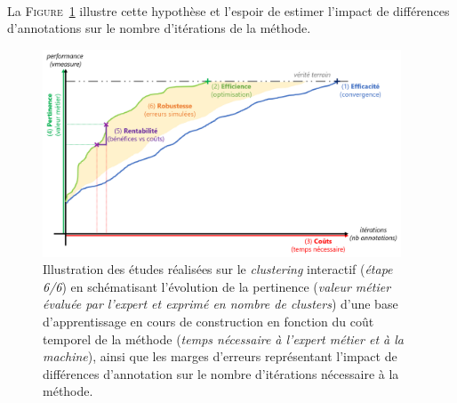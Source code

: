 	\begin{tcolorbox}[
		title=\faVial~\textbf{Hypothèse de robustesse}~\faVial,
		colback=colorTcolorboxHypothesis!15,
		colframe=colorTcolorboxHypothesis!75,
		width=\linewidth
	]
		 \\
		
		La \textsc{Figure~\ref{figure:4.6-HYPOTHESE-ROBUSTESSE}} illustre cette hypothèse et l'espoir de estimer l'impact de différences d'annotations sur le nombre d'itérations de la méthode.
		\begin{figure}[H]  %
			\centering
			\includegraphics[width=0.95\textwidth]{figures/hypotheses-06-robustesse}
			\caption{
				Illustration des études réalisées sur le \textit{clustering} interactif (\textit{étape 6/6}) en schématisant l'évolution de la pertinence (\textit{valeur métier évaluée par l'expert et exprimé en nombre de clusters}) d'une base d'apprentissage en cours de construction en fonction du coût temporel de la méthode (\textit{temps nécessaire à l'expert métier et à la machine}), ainsi que les marges d'erreurs représentant l'impact de différences d'annotation sur le nombre d'itérations nécessaire à la méthode.
			}
			\label{figure:4.6-HYPOTHESE-ROBUSTESSE}
		\end{figure}
	\end{tcolorbox}
	
